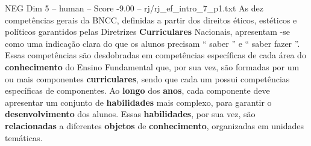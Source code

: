 \begin{textsample}{NEG Dim 5 – human – Score -9.00 – rj/rj\_ef\_intro\_7\_p1.txt}  \label{ex:f5_neg_018}
As dez competências gerais da BNCC, definidas a partir dos direitos éticos, estéticos e políticos garantidos pelas Diretrizes \textbf{Curriculares} Nacionais, apresentam -se como uma indicação clara do que os alunos precisam “ saber ” e “ saber fazer ”.
Essas competências são desdobradas em competências específicas de cada área do \textbf{conhecimento} do Ensino Fundamental que, por sua vez, são formadas por um ou mais componentes \textbf{curriculares}, sendo que cada um possui competências específicas de componentes.
Ao \textbf{longo} dos \textbf{anos}, cada componente deve apresentar um conjunto de \textbf{habilidades} mais complexo, para garantir o \textbf{desenvolvimento} dos alunos.
Essas \textbf{habilidades}, por sua vez, são \textbf{relacionadas} a diferentes \textbf{objetos} de \textbf{conhecimento}, organizadas em unidades temáticas.

\end{textsample}
